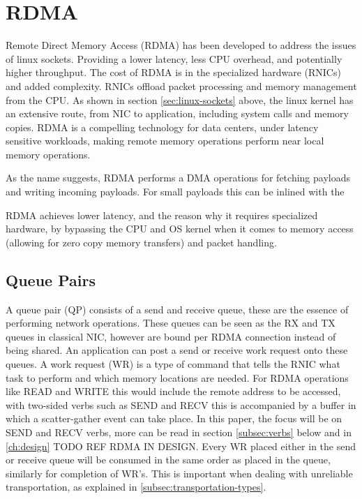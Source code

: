 \section[RDMA]{RDMA}\label{sec:rdma}
Remote Direct Memory Access (RDMA) has been developed to address the issues of linux sockets.
Providing a lower latency, less CPU overhead, and potentially higher throughput.
The cost of RDMA is in the specialized hardware (RNICs) and added complexity.
RNICs offload packet processing and memory management from the CPU.
As shown in section \ref{sec:linux-sockets} above, the linux kernel has an extensive route, from NIC to application, including system calls and memory copies.
RDMA is a compelling technology for data centers, under latency sensitive workloads, making remote memory operations perform near local memory operations.

As the name suggests, RDMA performs a DMA operations for fetching payloads and writing incoming payloads.
For small payloads this can be inlined with the

RDMA achieves lower latency, and the reason why it requires specialized hardware, by bypassing the CPU and OS kernel when it comes to memory access (allowing for zero copy memory transfers) and packet handling.

\subsection{Queue Pairs}\label{subsec:queue-pairs}
A queue pair (QP) consists of a send and receive queue, these are the essence of performing network operations.
These queues can be seen as the RX and TX queues in classical NIC, however are bound per RDMA connection instead of being shared.
An application can post a send or receive work request onto these queues.
A work request (WR) is a type of command that tells the RNIC what task to perform and which memory locations are needed.
For RDMA operations like READ and WRITE this would include the remote address to be accessed, with two-sided verbs such as SEND and RECV this is accompanied by a buffer in which a scatter-gather event can take place.
In this paper, the focus will be on SEND and RECV verbs, more can be read in section \ref{subsec:verbs} below and in \ref{ch:design} TODO REF RDMA IN DESIGN.
Every WR placed either in the send or receive queue will be consumed in the same order as placed in the queue, similarly for completion of WR's.
This is important when dealing with unreliable transportation, as explained in \ref{subsec:transportation-types}.

